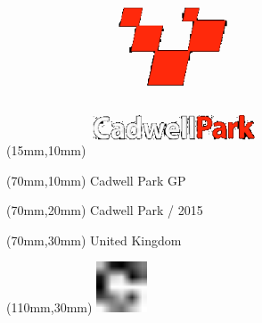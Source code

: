 \null\newpage
\begin{textblock*}{50mm}(15mm,10mm)%
\includegraphics[width=50mm]{LG/CAD.png}
\end{textblock*}
\begin{textblock*}{130mm}(70mm,10mm)%
{\fontsize{20}{20}\selectfont Cadwell Park GP}\\
\end{textblock*}
\begin{textblock*}{120mm}(70mm,20mm)%
{\fontsize{16}{16}\selectfont Cadwell Park / 2015}\\
\end{textblock*}
\begin{textblock*}{120mm}(70mm,30mm)%
{\fontsize{12}{12}\selectfont United Kingdom}
\end{textblock*}
\begin{textblock*}{30mm}(110mm,30mm)%
\centering
\includegraphics[height=15mm]{icons/fa-rotate-right.pdf}
\end{textblock*}

